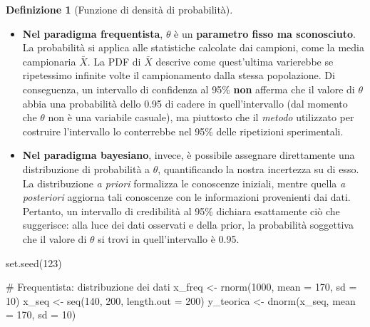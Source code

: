\documentclass[
  italian,
  letterpaper,
  a4paper,
  11pt,
  open=any]{scrbook}
\newenvironment{Shaded}{\begin{snugshade}}{\end{snugshade}}
\newcommand{\AttributeTok}[1]{\textcolor[rgb]{0.40,0.45,0.13}{#1}}
\newcommand{\CommentTok}[1]{\textcolor[rgb]{0.37,0.37,0.37}{#1}}
\newcommand{\DecValTok}[1]{\textcolor[rgb]{0.68,0.00,0.00}{#1}}
\newcommand{\FunctionTok}[1]{\textcolor[rgb]{0.28,0.35,0.67}{#1}}
\newcommand{\NormalTok}[1]{\textcolor[rgb]{0.00,0.23,0.31}{#1}}
\newcommand{\OtherTok}[1]{\textcolor[rgb]{0.00,0.23,0.31}{#1}}
\theoremstyle{plain}
\theoremstyle{definition}
\theoremstyle{definition}
\newtheorem{definition}{Definizione}[chapter]
\theoremstyle{remark}
\begin{document}
\begin{definition}[Funzione di densità di
probabilità]
\begin{itemize}
\item
  \textbf{Nel paradigma frequentista}, \(\theta\) è un \textbf{parametro
  fisso ma sconosciuto}. La probabilità si applica alle statistiche
  calcolate dai campioni, come la media campionaria \(\bar{X}\). La PDF
  di \(\bar{X}\) descrive come quest'ultima varierebbe se ripetessimo
  infinite volte il campionamento dalla stessa popolazione. Di
  conseguenza, un intervallo di confidenza al 95\% \textbf{non} afferma
  che il valore di \(\theta\) abbia una probabilità dello 0.95 di cadere
  in quell'intervallo (dal momento che \(\theta\) non è una variabile
  casuale), ma piuttosto che il \emph{metodo} utilizzato per costruire
  l'intervallo lo conterrebbe nel 95\% delle ripetizioni sperimentali.
\item
  \textbf{Nel paradigma bayesiano}, invece, è possibile assegnare
  direttamente una distribuzione di probabilità a \(\theta\),
  quantificando la nostra incertezza su di esso. La distribuzione
  \emph{a priori} formalizza le conoscenze iniziali, mentre quella
  \emph{a posteriori} aggiorna tali conoscenze con le informazioni
  provenienti dai dati. Pertanto, un intervallo di credibilità al 95\%
  dichiara esattamente ciò che suggerisce: alla luce dei dati osservati
  e della prior, la probabilità soggettiva che il valore di \(\theta\)
  si trovi in quell'intervallo è 0.95.
\end{itemize}

\begin{Shaded}
\begin{Highlighting}[]
\FunctionTok{set.seed}\NormalTok{(}\DecValTok{123}\NormalTok{)}

\CommentTok{\# Frequentista: distribuzione dei dati}
\NormalTok{x\_freq }\OtherTok{\textless{}{-}} \FunctionTok{rnorm}\NormalTok{(}\DecValTok{1000}\NormalTok{, }\AttributeTok{mean =} \DecValTok{170}\NormalTok{, }\AttributeTok{sd =} \DecValTok{10}\NormalTok{)}
\NormalTok{x\_seq }\OtherTok{\textless{}{-}} \FunctionTok{seq}\NormalTok{(}\DecValTok{140}\NormalTok{, }\DecValTok{200}\NormalTok{, }\AttributeTok{length.out =} \DecValTok{200}\NormalTok{)}
\NormalTok{y\_teorica }\OtherTok{\textless{}{-}} \FunctionTok{dnorm}\NormalTok{(x\_seq, }\AttributeTok{mean =} \DecValTok{170}\NormalTok{, }\AttributeTok{sd =} \DecValTok{10}\NormalTok{)}


\end{Highlighting}
\end{Shaded}
\end{definition}
\end{document}
